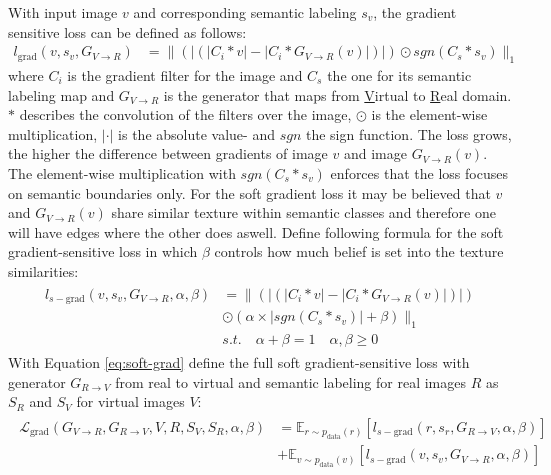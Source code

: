 With input image $v$ and corresponding semantic labeling $s_v$, the gradient sensitive loss can be defined as follows:
\begin{align}
		l_{\text{grad}}(v,s_v,G_{V\rightarrow R}) &= \lVert(|(|C_i * v |-|C_i*G_{V\rightarrow R}(v)|)|) \odot sgn(C_s*s_v)\rVert_1
\end{align}
where $C_i$ is the gradient filter for the image and $C_s$ the one for its semantic labeling map and $G_{V\rightarrow R}$ is the generator that maps from \underline{V}irtual to \underline{R}eal domain. $*$ describes the convolution of the filters over the image, $\odot$ is the element-wise multiplication, $|\cdot|$ is the absolute value- and $sgn$ the sign function. The loss grows, the higher the difference between gradients of image $v$ and image $G_{V\rightarrow R}(v)$. The element-wise multiplication with $sgn(C_s * s_v)$ enforces that the loss focuses on semantic boundaries only. For the soft gradient loss it may be believed that $v$ and $G_{V\rightarrow R}(v)$ share similar texture within semantic classes and therefore one will have edges where the other does aswell. Define following formula for the soft gradient-sensitive loss in which $\beta$ controls how much belief is set into the texture similarities:
\begin{align}
	\begin{split}
		l_{s-\text{grad}}(v, s_v, G_{V\rightarrow R}, \alpha, \beta) &= \lVert(|(|C_i*v|-|C_i*G_{V\rightarrow R}(v)|)|)\\
		&\odot (\alpha \times |sgn(C_s*s_v)|+\beta)\rVert_1\\
		&s.t. \quad \alpha + \beta = 1 \quad \alpha, \beta \geq 0
	\end{split} \label{eq:soft-grad}
\end{align}
With Equation \ref{eq:soft-grad} define the full soft gradient-sensitive loss with generator $G_{R\rightarrow V}$ from real to virtual and semantic labeling for real images $R$ as $S_R$ and $S_V$ for virtual images $V$:
\begin{align}
	\begin{split}
		\mathcal{L}_{\text{grad}}(G_{V\rightarrow R}, G_{R\rightarrow V}, V, R, S_V, S_R, \alpha, \beta) &= \mathbb{E}_{r\sim p_{\text{data}}(r)}[l_{s-\text{grad}}(r,s_r, G_{R\rightarrow V}, \alpha, \beta)]\\
		&+ \mathbb{E}_{v\sim p_{\text{data}}(v)}[l_{s-\text{grad}}(v,s_v, G_{V\rightarrow R}, \alpha, \beta)]
	\end{split}
\end{align}
